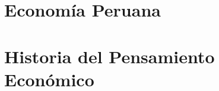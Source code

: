 \documentclass[12pt, a4paper, twoside]{book}
\begin{document}
% 
% 
% 

% 
% 
% 

\chapter{Economía Peruana}

% 
% 
% 

% 
% 
% 

% 
% 
% 

% 
% 
% 

% 
% 
% 

% 
% 
% 

% 
% 
% 

% 
% 
% 

% 
% 
% 

\chapter{Historia del Pensamiento Económico}
\end{document}
